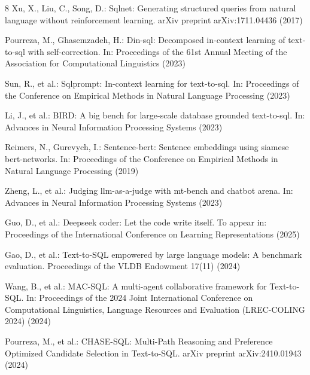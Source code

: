 \documentclass[runningheads]{llncs}
\begin{document}
\begin{thebibliography}{8}
Xu, X., Liu, C., Song, D.: Sqlnet: Generating structured queries from natural language without reinforcement learning. arXiv preprint arXiv:1711.04436 (2017)

Pourreza, M., Ghasemzadeh, H.: Din-sql: Decomposed in-context learning of text-to-sql with self-correction. In: Proceedings of the 61st Annual Meeting of the Association for Computational Linguistics (2023)

Sun, R., et al.: Sqlprompt: In-context learning for text-to-sql. In: Proceedings of the Conference on Empirical Methods in Natural Language Processing (2023)

Li, J., et al.: BIRD: A big bench for large-scale database grounded text-to-sql. In: Advances in Neural Information Processing Systems (2023)

Reimers, N., Gurevych, I.: Sentence-bert: Sentence embeddings using siamese bert-networks. In: Proceedings of the Conference on Empirical Methods in Natural Language Processing (2019)

Zheng, L., et al.: Judging llm-as-a-judge with mt-bench and chatbot arena. In: Advances in Neural Information Processing Systems (2023)

Guo, D., et al.: Deepseek coder: Let the code write itself. To appear in: Proceedings of the International Conference on Learning Representations (2025)

Gao, D., et al.: Text-to-SQL empowered by large language models: A benchmark evaluation. Proceedings of the VLDB Endowment 17(11) (2024)

Wang, B., et al.: MAC-SQL: A multi-agent collaborative framework for Text-to-SQL. In: Proceedings of the 2024 Joint International Conference on Computational Linguistics, Language Resources and Evaluation (LREC-COLING 2024) (2024)

Pourreza, M., et al.: CHASE-SQL: Multi-Path Reasoning and Preference Optimized Candidate Selection in Text-to-SQL. arXiv preprint arXiv:2410.01943 (2024)

\end{thebibliography}
\end{document}
